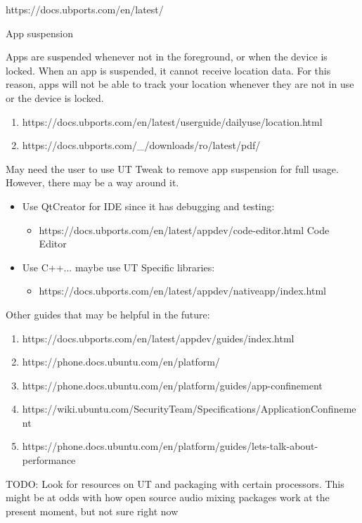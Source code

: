 
https://docs.ubports.com/en/latest/
\label{ch: considerations}





%



App suspension

Apps are suspended whenever not in the foreground, or when the device is locked. When an app is suspended, it cannot receive location data. For this reason, apps will not be able to track your location whenever they are not in use or the device is locked.

\begin{enumerate}
	\item https://docs.ubports.com/en/latest/userguide/dailyuse/location.html
	\item https://docs.ubports.com/\_/downloads/ro/latest/pdf/
\end{enumerate}

May need the user to use UT Tweak to remove app suspension for full usage.
However, there may be a way around it.

\vspace{10 pt}

\begin{itemize}
	\item Use QtCreator for IDE since it has debugging and testing:
	\begin{itemize}
		\item https://docs.ubports.com/en/latest/appdev/code-editor.html
	Code Editor
	\end{itemize}
\end{itemize}


\begin{itemize}
	\item Use C++... maybe use UT Specific libraries:
	\begin{itemize}
		\item https://docs.ubports.com/en/latest/appdev/nativeapp/index.html
	\end{itemize}
\end{itemize}





\vspace{10 pt}


Other guides that may be helpful in the future:
\begin{enumerate}
	\item https://docs.ubports.com/en/latest/appdev/guides/index.html
	\item https://phone.docs.ubuntu.com/en/platform/
	\item https://phone.docs.ubuntu.com/en/platform/guides/app-confinement
	\item https://wiki.ubuntu.com/SecurityTeam/Specifications/ApplicationConfinement
	\item https://phone.docs.ubuntu.com/en/platform/guides/lets-talk-about-performance
\end{enumerate}


TODO: Look for resources on UT and packaging with certain processors. This might be at odds with how open source audio mixing packages work at the present moment, but not sure right now